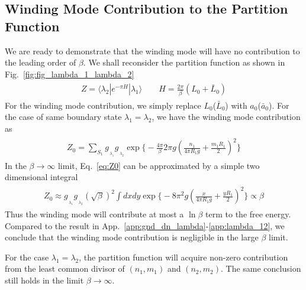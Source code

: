 \subsection{Winding Mode Contribution to the Partition Function}
\label{app_sub:winding_contribution}
We are ready to demonstrate that the winding mode will have no contribution to the leading order of $\beta$. We shall reconsider the partition function as shown in Fig.~\ref{fig:fig_lambda_1_lambda_2}
\begin{eqnarray}\begin{aligned}
Z=\langle\lambda_2|e^{-\pi H}|\lambda_1\rangle\qquad H=\frac{2\pi}{\beta}(L_0+\bar{L}_0)
\end{aligned}\end{eqnarray}
For the winding mode contribution, we simply replace $L_0$($\bar{L}_0$) with $a_0$($\bar{a}_0$). For the case of same boundary state $\lambda_1=\lambda_2$, we have the winding mode contribution as
\begin{eqnarray}\begin{aligned}
\label{eq:Z0}
Z_0 = \sum_{S_1 } g_{\,\!_{\lambda_1} }g_{\,\!_{\lambda_2} } \exp\Big\{- \frac{4\pi}{\beta} 2 \pi g ( \frac{n_1}{ 4 \pi R_1 g} + \frac{m_1 R_1 }{ 2} )^2 \Big\}
\end{aligned}\end{eqnarray}
In the $\beta\rightarrow\infty$ limit, Eq.~\eqref{eq:Z0} can be approximated by a simple two dimensional integral
\begin{eqnarray}\begin{aligned}
Z_0\approx g_{\,\!_{\lambda_1} }g_{\,\!_{\lambda_2} } (\sqrt{\beta})^2\int dxdy\exp\Big\{-8 \pi^2 g ( \frac{x}{ 4 \pi R_1 g} + \frac{y R_1 }{ 2} )^2 \Big\}\propto\beta
\end{aligned}\end{eqnarray}
Thus the winding mode will contribute at most a $\ln\beta$ term to the free energy. Compared to the result in App.~\ref{app:gnd_dn_lambda}-\ref{app:lambda_12}, we conclude that the winding mode contribution is negligible in the large $\beta$ limit. 

For the case $\lambda_1=\lambda_2$, the partition function will acquire non-zero contribution from the least common divisor of $(n_1,m_1)$ and $(n_2,m_2)$. The same conclusion still holds in the limit $\beta\rightarrow\infty$. 
